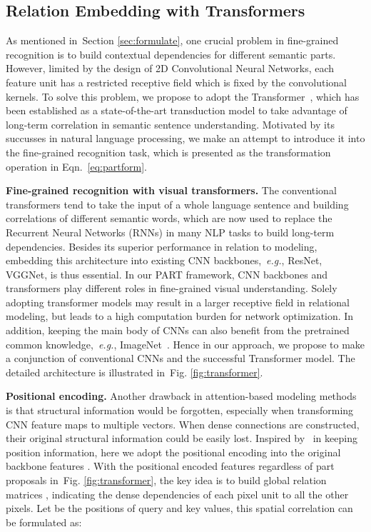 \documentclass[journal]{IEEEtran}
\def\eg{{\em e.g.}}
\newcommand{\figref}[1]{Fig. \ref{#1}}
\newcommand{\secref}[1]{Section \ref{#1}}
\begin{document}
\subsection{Relation Embedding with Transformers}\label{sec:relationembed}
As mentioned in~\secref{sec:formulate}, one crucial problem in fine-grained recognition is to build contextual dependencies for different semantic parts.
However, limited by the design of 2D Convolutional Neural Networks, each feature unit has a restricted receptive field which is fixed by the convolutional kernels. To solve this problem, we propose to adopt the Transformer~\cite{vaswani2017attention}, which has been established as a state-of-the-art transduction model to take advantage of long-term correlation in semantic sentence understanding. Motivated by its succusses in natural language processing, we make an attempt to introduce it into the fine-grained recognition task, which is presented as the transformation operation in Eqn.~\eqref{eq:partform}.

\textbf{Fine-grained recognition with visual transformers.} The conventional transformers tend to take the input of a whole language sentence and building correlations of different semantic words, which are now used to replace the Recurrent Neural Networks (RNNs) in many NLP tasks to build long-term dependencies. Besides its superior performance in relation to modeling, embedding this architecture into existing CNN backbones,~\eg, ResNet, VGGNet, is thus essential. In our PART framework, CNN backbones and transformers play different roles in fine-grained visual understanding. Solely adopting transformer models may result in a larger receptive field in relational modeling, but leads to a high computation burden for network optimization. In addition, keeping the main body of CNNs can also benefit from the pretrained common knowledge,~\eg, ImageNet~\cite{deng2009imagenet}. Hence in our approach, we propose to make a conjunction of conventional CNNs and the successful Transformer model. The detailed architecture is illustrated in~\figref{fig:transformer}.



\textbf{Positional encoding.}
Another drawback in attention-based modeling methods is that structural information would be forgotten, especially when transforming CNN feature maps  to multiple vectors. When dense connections are constructed, their original structural information could be easily lost.
Inspired by~\cite{vaswani2017attention,carion2020end} in keeping position information, here we adopt the positional encoding  into the original backbone features . With the positional encoded features regardless of part proposals in~\figref{fig:transformer}, the key idea is to build global relation matrices , indicating the dense dependencies of each pixel unit to all the other pixels. Let  be the positions of query and key values, this spatial correlation can be formulated as:
\end{document}
